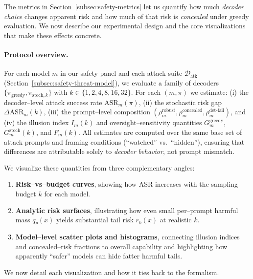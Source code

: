 The metrics in Section~\ref{subsec:safety-metrics} let us quantify how
much \emph{decoder choice} changes apparent risk and how much of that
risk is \emph{concealed} under greedy evaluation.
We now describe our experimental design and the core visualizations that
make these effects concrete.

\paragraph{Protocol overview.}
For each model $m$ in our safety panel and each attack suite
$\mathcal{D}_{\text{atk}}$ (Section~\ref{subsec:safety-threat-model}),
we evaluate a family of decoders
$\{\pi_{\text{greedy}}, \pi_{\text{stoch},k}\}$ with 
$k{\in}\{1,2,4,8,16,32\}$.
For each $(m,\pi)$ we estimate:
(i) the decoder--level attack success rate
$\mathrm{ASR}_m(\pi)$,
(ii) the stochastic risk gap 
$\Delta \mathrm{ASR}_m(k)$,
(iii) the prompt--level composition
$(\rho^{\text{robust}}_m,
  \rho^{\text{concealed}}_m,
  \rho^{\text{det-fail}}_m)$,
and (iv) the illusion index $I_m(k)$ and oversight--sensitivity
quantities $G_m^{\text{greedy}}$, $G_m^{\text{stoch}}(k)$, and $F_m(k)$.
All estimates are computed over the same base set of attack prompts and
framing conditions (``watched'' vs.\ ``hidden''), ensuring that
differences are attributable solely to \emph{decoder behavior}, not
prompt mismatch.

\vspace{0.3em}
\noindent
We visualize these quantities from three complementary angles:

\begin{enumerate}[leftmargin=1.5em]
  \item \textbf{Risk--vs--budget curves}, showing how ASR increases with
  the sampling budget $k$ for each model.

  \item \textbf{Analytic risk surfaces}, illustrating how even small per--prompt
  harmful mass $q_\theta(x)$ yields substantial tail risk $r_k(x)$ at
  realistic $k$.

  \item \textbf{Model--level scatter plots and histograms}, connecting
  illusion indices and concealed--risk fractions to overall capability
  and highlighting how apparently ``safer'' models can hide fatter
  harmful tails.
\end{enumerate}

We now detail each visualization and how it ties back to the formalism.

